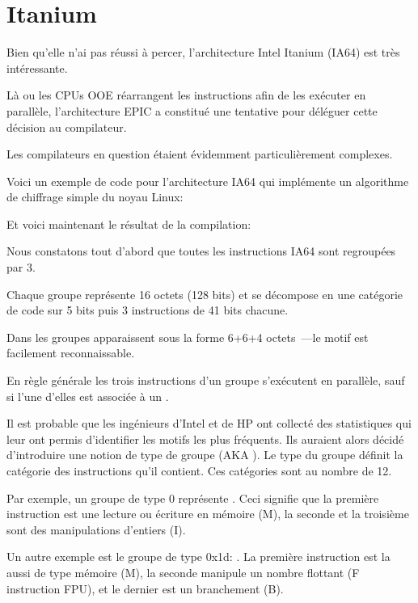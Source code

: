 ﻿\section{Itanium}
\label{itanium}

Bien qu'elle n'ai pas réussi à percer, l'architecture  Intel Itanium (\ac{IA64}) est très intéressante.

Là ou les CPUs \ac{OOE} réarrangent les instructions afin de les exécuter en parallèle, l'architecture 
\ac{EPIC} a constitué une tentative pour déléguer cette décision au compilateur.

Les compilateurs en question étaient évidemment particulièrement complexes.

Voici un exemple de code pour l'architecture \ac{IA64} qui implémente un algorithme de 
chiffrage simple du noyau Linux:



Et voici maintenant le résultat de la compilation:



Nous constatons tout d'abord que toutes les instructions \ac{IA64} sont regroupées par 3.

Chaque groupe représente 16 octets (128 bits) et se décompose en une catégorie de code sur 5 bits 
puis 3 instructions de 41 bits chacune.

Dans \IDA les groupes apparaissent sous la forme 6+6+4 octets~---le motif est facilement 
reconnaissable.

En règle générale les trois instructions d'un groupe s'exécutent en parallèle, sauf si l'une d'elles 
est associée à un .

Il est probable que les ingénieurs d'Intel et de HP ont collecté des statistiques qui leur ont permis 
d'identifier les motifs les plus fréquents. Ils auraient alors décidé d'introduire une notion de 
type de groupe (\ac{AKA} ). Le type du groupe définit la catégorie des instructions 
qu'il contient. Ces catégories sont au nombre de 12.

Par exemple, un groupe de type 0 représente . Ceci signifie que la première instruction est 
une lecture ou écriture en mémoire (M), la seconde et la troisième sont des manipulations d'entiers 
(I).

Un autre exemple est le groupe de type 0x1d: . La première instruction est la aussi de type 
mémoire (M), la seconde manipule un nombre flottant (F instruction \ac{FPU}), et le dernier est un 
branchement (B).


